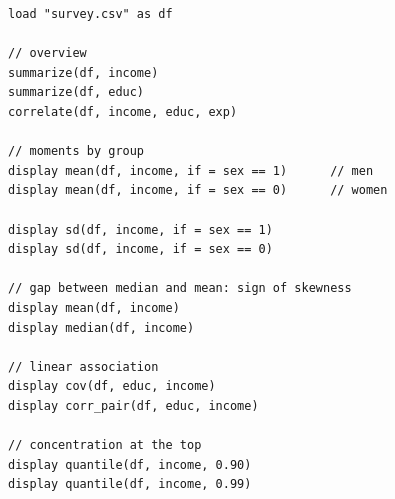 \begin{lstlisting}[caption={Exploratory analysis — income and education}]
load "survey.csv" as df

// overview
summarize(df, income)
summarize(df, educ)
correlate(df, income, educ, exp)

// moments by group
display mean(df, income, if = sex == 1)      // men
display mean(df, income, if = sex == 0)      // women

display sd(df, income, if = sex == 1)
display sd(df, income, if = sex == 0)

// gap between median and mean: sign of skewness
display mean(df, income)
display median(df, income)

// linear association
display cov(df, educ, income)
display corr_pair(df, educ, income)

// concentration at the top
display quantile(df, income, 0.90)
display quantile(df, income, 0.99)
\end{lstlisting}
